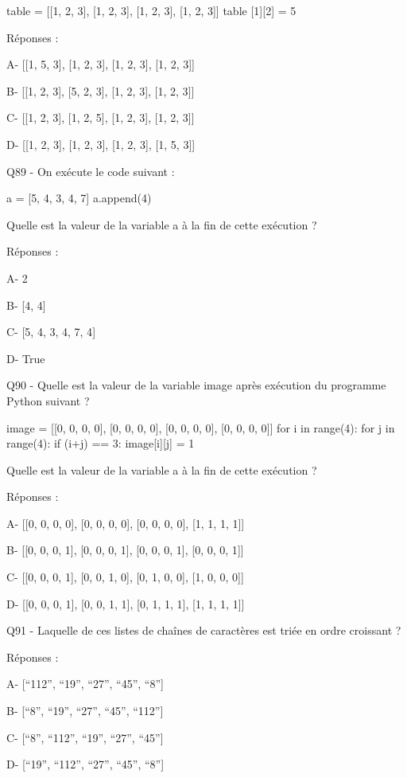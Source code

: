 \documentclass[
]{book}
\begin{document}
table = {[}{[}1, 2, 3{]}, {[}1, 2, 3{]}, {[}1, 2, 3{]}, {[}1, 2, 3{]}{]}
table {[}1{]}{[}2{]} = 5

Réponses :

A- {[}{[}1, 5, 3{]}, {[}1, 2, 3{]}, {[}1, 2, 3{]}, {[}1, 2, 3{]}{]}

B- {[}{[}1, 2, 3{]}, {[}5, 2, 3{]}, {[}1, 2, 3{]}, {[}1, 2, 3{]}{]}

C- {[}{[}1, 2, 3{]}, {[}1, 2, 5{]}, {[}1, 2, 3{]}, {[}1, 2, 3{]}{]}

D- {[}{[}1, 2, 3{]}, {[}1, 2, 3{]}, {[}1, 2, 3{]}, {[}1, 5, 3{]}{]}

Q89 - On exécute le code suivant :

a = {[}5, 4, 3, 4, 7{]}
a.append(4)

Quelle est la valeur de la variable a à la fin de cette exécution ?

Réponses :

A- 2

B- {[}4, 4{]}

C- {[}5, 4, 3, 4, 7, 4{]}

D- True

Q90 - Quelle est la valeur de la variable image après exécution du programme Python suivant ?

image = {[}{[}0, 0, 0, 0{]}, {[}0, 0, 0, 0{]}, {[}0, 0, 0, 0{]}, {[}0, 0, 0, 0{]}{]}
for i in range(4):
for j in range(4):
if (i+j) == 3:
image{[}i{]}{[}j{]} = 1

Quelle est la valeur de la variable a à la fin de cette exécution ?

Réponses :

A- {[}{[}0, 0, 0, 0{]}, {[}0, 0, 0, 0{]}, {[}0, 0, 0, 0{]}, {[}1, 1, 1, 1{]}{]}

B- {[}{[}0, 0, 0, 1{]}, {[}0, 0, 0, 1{]}, {[}0, 0, 0, 1{]}, {[}0, 0, 0, 1{]}{]}

C- {[}{[}0, 0, 0, 1{]}, {[}0, 0, 1, 0{]}, {[}0, 1, 0, 0{]}, {[}1, 0, 0, 0{]}{]}

D- {[}{[}0, 0, 0, 1{]}, {[}0, 0, 1, 1{]}, {[}0, 1, 1, 1{]}, {[}1, 1, 1, 1{]}{]}

Q91 - Laquelle de ces listes de chaînes de caractères est triée en ordre croissant ?

Réponses :

A- {[}``112'', ``19'', ``27'', ``45'', ``8''{]}

B- {[}``8'', ``19'', ``27'', ``45'', ``112''{]}

C- {[}``8'', ``112'', ``19'', ``27'', ``45''{]}

D- {[}``19'', ``112'', ``27'', ``45'', ``8''{]}
\end{document}
